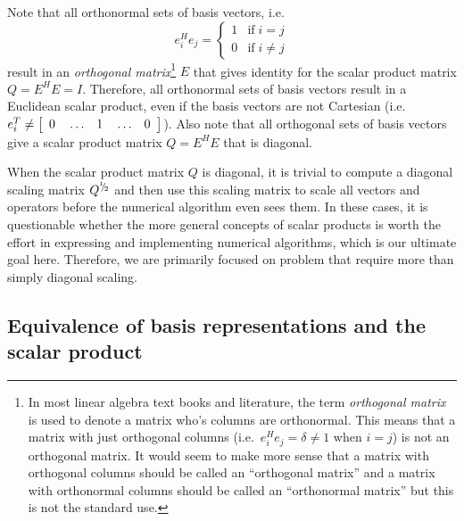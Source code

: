 \documentclass[pdf,ps2pdf,11pt]{SANDreport}
\begin{document}
Note that all orthonormal sets of basis vectors, i.e.
\[
e_i^H e_j = \left\{ \begin{array}{ll} 1 & \mbox{if} \; i = j \\ 0 & \mbox{if} \; i \ne j \end{array}  \right.
\]
result in an \textit{orthogonal matrix}\footnote{
%
In most linear algebra text books and
literature, the term {}\textit{orthogonal matrix} is used to denote a matrix
who's columns are orthonormal.  This means that a matrix with just orthogonal
columns (i.e.\ $e_i^H e_j = \delta \ne 1$ when $i=j$) is not an orthogonal
matrix.  It would seem to make more sense that a matrix with orthogonal
columns should be called an ``orthogonal matrix'' and a matrix with
orthonormal columns should be called an ``orthonormal matrix'' but this is not
the standard use.
%
} $E$ that gives identity for the scalar product matrix $Q = E^H E = I$.
Therefore, all orthonormal sets of basis vectors result in a Euclidean scalar
product, even if the basis vectors are not Cartesian (i.e.\ $e_i^T {}\ne
{\bmat{ccccc} 0 & {}\ldots & 1 & {}\ldots & 0 {}\emat}$). Also note that all
orthogonal sets of basis vectors give a scalar product matrix $Q = E^H E$ that
is diagonal.

When the scalar product matrix $Q$ is diagonal, it is trivial to compute a
diagonal scaling matrix $Q^{\myonehalf}$ and then use this scaling matrix to
scale all vectors and operators before the numerical algorithm even sees them.
In these cases, it is questionable whether the more general concepts of scalar
products is worth the effort in expressing and implementing numerical
algorithms, which is our ultimate goal here.  Therefore, we are primarily
focused on problem that require more than simply diagonal scaling.

\subsection{Equivalence of basis representations and the scalar product}
\end{document}
